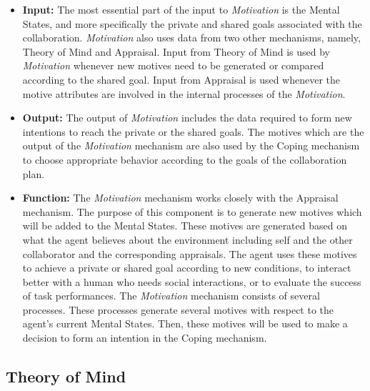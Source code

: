 \documentclass[12pt]{report}
\begin{document}
\begin{itemize}
  \item \textbf{Input:} The most essential part of the input to
  \textit{Motivation} is the Mental States, and more specifically the private
  and shared goals associated with the collaboration. \textit{Motivation} also
  uses data from two other mechanisms, namely, Theory of Mind and Appraisal.
  Input from Theory of Mind is used by \textit{Motivation} whenever new motives
  need to be generated or compared according to the shared goal. Input from
  Appraisal is used whenever the motive attributes are involved in the internal
  processes of the \textit{Motivation}.
  
  \item \textbf{Output:} The output of \textit{Motivation} includes the data
  required to form new intentions to reach the private or the shared goals.
  The motives which are the output of the \textit{Motivation} mechanism
  are also used by the Coping mechanism to choose appropriate behavior according
  to the goals of the collaboration plan.
  
  \item \textbf{Function:} The \textit{Motivation} mechanism works closely  
  with the Appraisal mechanism. The purpose of this component is to generate new
  motives which will be added to the Mental States. These motives are generated
  based on what the agent believes about the environment including self and the
  other collaborator and the corresponding appraisals. The agent uses these
  motives to achieve a private or shared goal according to new conditions, to
  interact better with a human who needs social interactions, or to evaluate the
  success of task performances. The \textit{Motivation} mechanism consists of
  several processes. These processes generate several motives with respect to
  the agent's current Mental States. Then, these motives will be used to make a
  decision to form an intention in the Coping mechanism.
\end{itemize}

\subsection{Theory of Mind}
\end{document}
